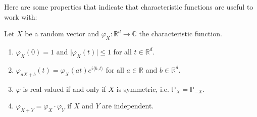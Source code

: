 Here are some properties that indicate that characteristic functions are useful to work with:
\begin{llemma}
\begin{lemma}\label{lemma_5111}
	Let $X$ be a random vector and $\varphi_X \colon \mathbb{R}^d \to \mathbb{C}$ the characteristic function.
	\begin{enumerate}[label=(\roman*)]
		\item $\varphi_X(0) = 1$ and $\lvert \varphi_X(t) \rvert \leq 1$ for all $t \in \mathbb{R}^d$.
		\item $\varphi_{aX+b}(t) = \varphi_X(a t)  e^{i\langle b,t \rangle}$ for all $ a \in \mathbb{R}$ and $b\in \mathbb{R}^d$.
		\item $\varphi$ is real-valued if and only if $X$ is symmetric, i.e. $\mathbb{P}_X = \mathbb{P}_{-X}$.
		\item $\varphi_{X+Y} = \varphi_X \cdot \varphi_Y$ if $X$ and $Y$ are independent.
	\end{enumerate}
\end{lemma}
\end{llemma}
